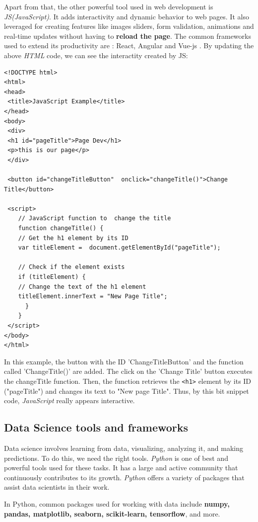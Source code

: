 \documentclass[12pt,a4paper]{report}
\begin{document}
Apart from that, the other powerful tool used in web development is \textit{JS(JavaScript)}. It adds interactivity and dynamic behavior to web pages. It also leveraged for creating features like images sliders, form validation, animations and real-time updates without having to \textbf{reload the page}. The common frameworks used to extend its productivity are : React, Angular and Vue-js \cite{wohlgethan2018supportingweb}. By updating the above \textit{HTML} code, we can see the interactity created by JS: 
\begin{lstlisting}[style=stylepython, label=lst:jsCode]
<!DOCTYPE html>
<html>
<head>
 <title>JavaScript Example</title>
</head>
<body>
 <div>
 <h1 id="pageTitle">Page Dev</h1>
 <p>this is our page</p>
 </div>
	
 <button id="changeTitleButton"  onclick="changeTitle()">Change  Title</button>
	
 <script>
 	// JavaScript function to  change the title
 	function changeTitle() {
 	// Get the h1 element by its ID
 	var titleElement =  document.getElementById("pageTitle");
	
 	// Check if the element exists
 	if (titleElement) {
	// Change the text of the h1 element
 	titleElement.innerText = "New Page Title";
	  }
	}
 </script>
</body>
</html>	
\end{lstlisting} 

In this example, the button with the ID 'ChangeTitleButton' and the function called 'ChangeTitle()' are added. The click on the 'Change Title' button executes the changeTitle function. Then, the function retrieves the \texttt{<h1>} element by its
ID ("pageTitle") and changes its text to "New page Title". Thus, by this bit snippet code, \textit{JavaScript} really appears interactive.

\subsection{Data Science tools and frameworks}
Data science involves learning from data, visualizing, analyzing it, and making predictions. To do this, we need the right tools. \textit{Python} is one of best and powerful tools used for these tasks. It has a large and active community that continuously contributes to its growth. \textit{Python} offers a variety of packages that assist data scientists in their work.

In Python, common packages used for working with data include\textbf{ numpy, pandas, matplotlib, seaborn, scikit-learn, tensorflow}, and more.
\end{document}
